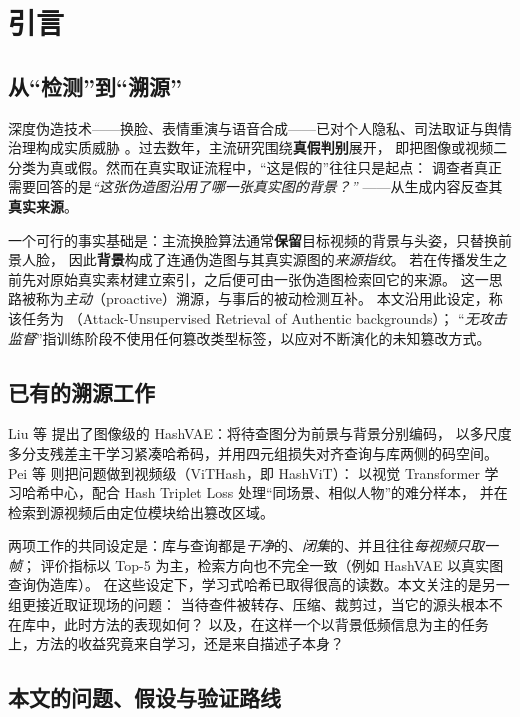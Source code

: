 \section{引言}

\subsection{从“检测”到“溯源”}

深度伪造技术——换脸、表情重演与语音合成——已对个人隐私、司法取证与舆情治理构成实质威胁
\cite{rossler2019faceforensics}。过去数年，主流研究围绕\textbf{真假判别}展开，
即把图像或视频二分类为真或假。然而在真实取证流程中，“这是假的”往往只是起点：
调查者真正需要回答的是\emph{“这张伪造图沿用了哪一张真实图的背景？”}
——从生成内容反查其\textbf{真实来源}。

一个可行的事实基础是：主流换脸算法通常\textbf{保留}目标视频的背景与头姿，只替换前景人脸，
因此\textbf{背景}构成了连通伪造图与其真实源图的\emph{来源指纹}。
若在传播发生之前先对原始真实素材建立索引，之后便可由一张伪造图检索回它的来源。
这一思路被称为\emph{主动}（proactive）溯源，与事后的被动检测互补。
本文沿用此设定，称该任务为 \aura{}（Attack-Unsupervised Retrieval of Authentic backgrounds）；
“\emph{无攻击监督}”指训练阶段不使用任何篡改类型标签，以应对不断演化的未知篡改方式。

\subsection{已有的溯源工作}

Liu 等\cite{liu2026hashvae} 提出了图像级的 HashVAE：将待查图分为前景与背景分别编码，
以多尺度多分支残差主干学习紧凑哈希码，并用四元组损失对齐查询与库两侧的码空间。
Pei 等\cite{pei2021vithash} 则把问题做到视频级（ViTHash，即 HashViT）：
以视觉 Transformer 学习哈希中心，配合 Hash Triplet Loss 处理“同场景、相似人物”的难分样本，
并在检索到源视频后由定位模块给出篡改区域。

两项工作的共同设定是：库与查询都是\emph{干净}的、\emph{闭集}的、并且往往\emph{每视频只取一帧}；
评价指标以 Top-5 为主，检索方向也不完全一致（例如 HashVAE 以真实图查询伪造库）。
在这些设定下，学习式哈希已取得很高的读数。本文关注的是另一组更接近取证现场的问题：
当待查件被转存、压缩、裁剪过，当它的源头根本不在库中，此时方法的表现如何？
以及，在这样一个以背景低频信息为主的任务上，方法的收益究竟来自学习，还是来自描述子本身？

\subsection{本文的问题、假设与验证路线}

